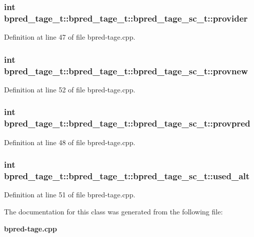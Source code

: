 \subsubsection[{provider}]{\setlength{\rightskip}{0pt plus 5cm}int bpred\_\-tage\_\-t::bpred\_\-tage\_\-t::bpred\_\-tage\_\-sc\_\-t::provider}\label{classbpred__tage__t_1_1bpred__tage__sc__t_520a0248e4e55df3253eaf65237ccf77}




Definition at line 47 of file bpred-tage.cpp.
\subsubsection[{provnew}]{\setlength{\rightskip}{0pt plus 5cm}int bpred\_\-tage\_\-t::bpred\_\-tage\_\-t::bpred\_\-tage\_\-sc\_\-t::provnew}\label{classbpred__tage__t_1_1bpred__tage__sc__t_9c3d83ad0c90fd98a60fe8feba03c0d0}




Definition at line 52 of file bpred-tage.cpp.
\subsubsection[{provpred}]{\setlength{\rightskip}{0pt plus 5cm}int bpred\_\-tage\_\-t::bpred\_\-tage\_\-t::bpred\_\-tage\_\-sc\_\-t::provpred}\label{classbpred__tage__t_1_1bpred__tage__sc__t_a904fd695be2b20c39713a59d4515c21}




Definition at line 48 of file bpred-tage.cpp.
\subsubsection[{used\_\-alt}]{\setlength{\rightskip}{0pt plus 5cm}int bpred\_\-tage\_\-t::bpred\_\-tage\_\-t::bpred\_\-tage\_\-sc\_\-t::used\_\-alt}\label{classbpred__tage__t_1_1bpred__tage__sc__t_94ce4bdf6adbea8ff6c5cd771e7172c8}




Definition at line 51 of file bpred-tage.cpp.

The documentation for this class was generated from the following file:\begin{CompactItemize}
\item 
{\bf bpred-tage.cpp}\end{CompactItemize}
